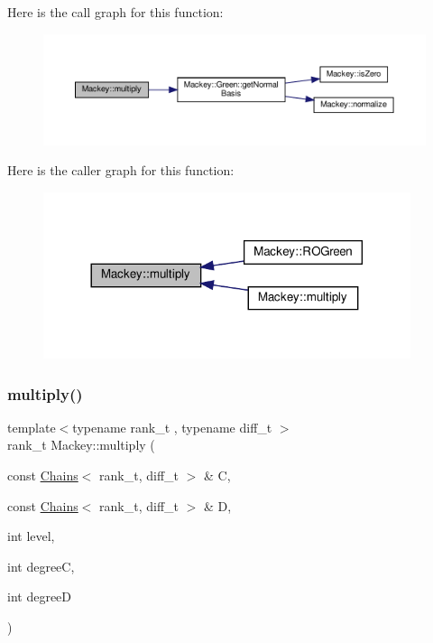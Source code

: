 Here is the call graph for this function\+:\nopagebreak
\begin{figure}[H]
\begin{center}
\leavevmode
\includegraphics[width=350pt]{namespaceMackey_a80dbde3a859378ede596b48869ec50d9_cgraph}
\end{center}
\end{figure}
Here is the caller graph for this function\+:\nopagebreak
\begin{figure}[H]
\begin{center}
\leavevmode
\includegraphics[width=305pt]{namespaceMackey_a80dbde3a859378ede596b48869ec50d9_icgraph}
\end{center}
\end{figure}
\mbox{\label{namespaceMackey_a2eca4cc709501ad3fc20b82fe4bcbd33}} 
\subsubsection{\texorpdfstring{multiply()}{multiply()}\hspace{0.1cm}{\footnotesize\ttfamily [2/2]}}
{\footnotesize\ttfamily template$<$typename rank\+\_\+t , typename diff\+\_\+t $>$ \\
rank\+\_\+t Mackey\+::multiply (\begin{DoxyParamCaption}\item[{const \hyperlink{classMackey_1_1Chains}{Chains}$<$ rank\+\_\+t, diff\+\_\+t $>$ \&}]{C,  }\item[{const \hyperlink{classMackey_1_1Chains}{Chains}$<$ rank\+\_\+t, diff\+\_\+t $>$ \&}]{D,  }\item[{int}]{level,  }\item[{int}]{degreeC,  }\item[{int}]{degreeD }\end{DoxyParamCaption})}

